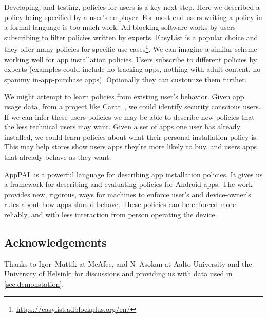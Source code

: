 \documentclass[]{llncs}
\begin{document}
Developing, and testing, policies for users is a key next step.
Here we described a policy being specified by a user's employer.
For most end-users writing a policy in a formal language is too much work.
Ad-blocking software works by users subscribing to filter policies written by experts.
EasyList is a popular choice and they offer many policies for specific use-cases\footnote{\url{https://easylist.adblockplus.org/en/}}.
We can imagine a similar scheme working well for app installation policies.
Users subscribe to different policies by experts (examples could include no tracking apps, nothing with adult content, no spammy in-app-purchase apps).
Optionally they can customize them further.

We might attempt to learn policies from existing user's behavior.
Given app usage data, from a project like Carat~\cite{Oliner:2013ht}, we could identify security conscious users.
If we can infer these users policies we may be able to describe new policies that the less technical users may want.
Given a set of apps one user has already installed, we could learn policies about what their personal installation policy is.
This may help stores show users apps they're more likely to buy, and users apps that already behave as they want.

AppPAL is a powerful language for describing app installation policies.
It gives us a framework for describing and evaluating policies for Android apps.
The work provides new, rigorous, ways for machines to enforce user's and device-owner's rules about how apps should behave.
These policies can be enforced more reliably, and with less interaction from person operating the device.

\subsection*{Acknowledgements}

Thanks to Igor~Muttik at McAfee, and N~Asokan at Aalto University and the University of Helsinki for discussions and providing us with data used in \autoref{sec:demonstation}.



\end{document}
